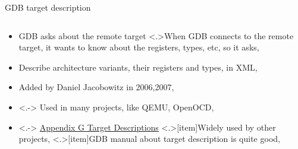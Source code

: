 \begin{frame}[squeeze]{GDB target description}
  \vspace{-2\baselineskip}

  \only<+->

  \begin{columns}[t]
    \begin{column}[t]{0.55\textwidth}

      \begin{itemize}
      \item<+-> GDB asks about the remote target
        \note<.>{When GDB connects to the remote target, it wants to know about the registers, types, etc, so it asks,}
      \item<+-> Describe architecture variants, their registers and types, in XML,
      \item<+-> Added by Daniel Jacobowitz in 2006,2007,
      \item<.-> Used in many projects, like QEMU, OpenOCD,
      \item<.-> \href{https://sourceware.org/gdb/current/onlinedocs/gdb/Target-Descriptions.html}{Appendix G Target Descriptions}
        \note<.>[item]{Widely used by other projects,}
        \note<.>[item]{GDB manual about target description is quite good,}
      \end{itemize}


\end{column}
\end{columns}
\end{frame}
